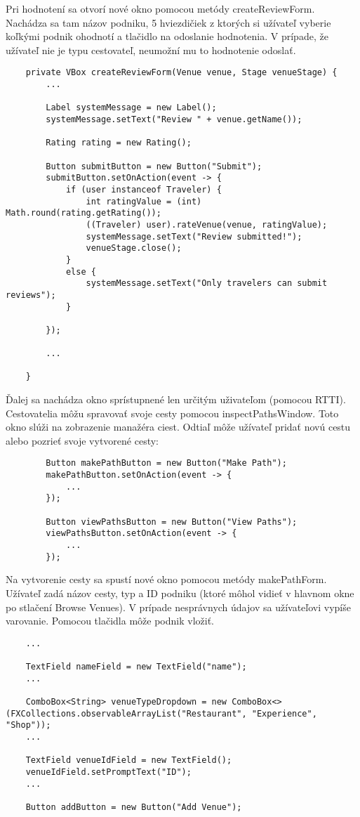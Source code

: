 \documentclass{article}
\begin{document}
Pri hodnotení sa otvorí nové okno pomocou metódy createReviewForm.
Nachádza sa tam názov podniku, 5 hviezdičiek z ktorých si užívateľ vyberie koľkými podnik ohodnotí a tlačidlo na odoslanie hodnotenia. V prípade, že užívateľ nie je typu cestovateľ, neumožní mu to hodnotenie odoslať.
\begin{verbatim}
    private VBox createReviewForm(Venue venue, Stage venueStage) {
        ...
        
        Label systemMessage = new Label();
        systemMessage.setText("Review " + venue.getName());

        Rating rating = new Rating();

        Button submitButton = new Button("Submit");
        submitButton.setOnAction(event -> {
            if (user instanceof Traveler) {
                int ratingValue = (int) Math.round(rating.getRating());
                ((Traveler) user).rateVenue(venue, ratingValue);
                systemMessage.setText("Review submitted!");
                venueStage.close();
            }
            else {
                systemMessage.setText("Only travelers can submit reviews");
            }

        });
        
        ...
    
    }
\end{verbatim}

Ďalej sa nachádza okno sprístupnené len určitým uživateľom (pomocou RTTI).
Cestovatelia môžu spravovať svoje cesty pomocou inspectPathsWindow.
Toto okno slúži na zobrazenie manažéra ciest. Odtiaľ môže užívateľ pridať novú cestu alebo pozrieť svoje vytvorené cesty:
\begin{verbatim}
        Button makePathButton = new Button("Make Path");
        makePathButton.setOnAction(event -> {
            ...
        });

        Button viewPathsButton = new Button("View Paths");
        viewPathsButton.setOnAction(event -> {
            ...
        });    
\end{verbatim}

Na vytvorenie cesty sa spustí nové okno pomocou metódy makePathForm. Užívateľ zadá názov cesty, typ a ID podniku (ktoré môhol vidieť v hlavnom okne po stlačení Browse Venues). V prípade nesprávnych údajov sa užívateľovi vypíše varovanie. Pomocou tlačidla môže podnik vložiť.
\begin{verbatim}
    ...
    
    TextField nameField = new TextField("name");
    ...

    ComboBox<String> venueTypeDropdown = new ComboBox<>(FXCollections.observableArrayList("Restaurant", "Experience", "Shop"));
    ...

    TextField venueIdField = new TextField();
    venueIdField.setPromptText("ID");
    ...

    Button addButton = new Button("Add Venue");
\end{verbatim}
\end{document}
